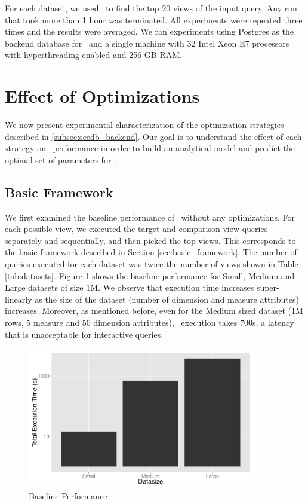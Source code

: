 For each dataset, we used \SeeDB\ to find the top 20 views of the input query.
Any run that took more than 1 hour was terminated. All experiments were repeated
three times and the results were averaged.
We ran experiments using Postgres as the backend database for \SeeDB\ and a single
machine with 32 Intel Xeon E7 processors with hyperthreading enabled and 256 GB
RAM.

\section{Effect of Optimizations}
\label{sec:experiments}
We now present experimental characterization of the optimization
strategies described in \ref{subsec:seedb_backend}. Our goal is to understand
the effect of each strategy on \SeeDB\ performance in order to build an
analytical model and predict the optimal set of parameters for \SeeDB.

\subsection{Basic Framework}
We first examined the baseline performance of \SeeDB\ without any optimizations.
For each possible view, we executed the target and comparison view queries
separately and sequentially, and then picked the top views. This corresponds to
the basic framework described in Section \ref{sec:basic_framework}. The number
of queries executed for each dataset was twice the number of views shown in
Table \ref{tab:datasets}. Figure \ref{fig:baseline_performance} shows the baseline
performance for Small, Medium and Large datasets of size 1M. We observe that
execution time increases super-linearly as the size of the dataset (number of dimension and
measure attributes) increases. Moreover, as mentioned before, even for the
Medium sized dataset (1M rows, 5 measure and 50 dimension attributes), \SeeDB\
execution takes 700s, a latency that is unacceptable for interactive queries.

\begin{figure}[h]

  \centering
    \includegraphics[width=10cm]{Images/baseline_performance.pdf}
    \caption{Baseline Performance} 
      \label{fig:baseline_performance}
\end{figure}

